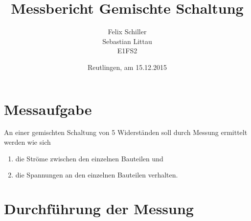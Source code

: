 \documentclass[
a4paper,     %
 headsepline, %
11pt         %
]{scrartcl}  %
\title{Messbericht Gemischte Schaltung}
\author{Felix Schiller \\ Sebastian Littau \\ E1FS2}
\date{Reutlingen, am 15.12.2015}
\begin{document}

\maketitle

\newpage
\tableofcontents





\section{Messaufgabe}
An einer gemischten Schaltung von 5 Widerständen soll durch Messung ermittelt werden wie sich 
\begin{enumerate}
	\item die Ströme zwischen den einzelnen Bauteilen und 
	\item die Spannungen an den einzelnen Bauteilen verhalten. 
\end{enumerate}


\section{Durchführung der Messung}
\end{document}
